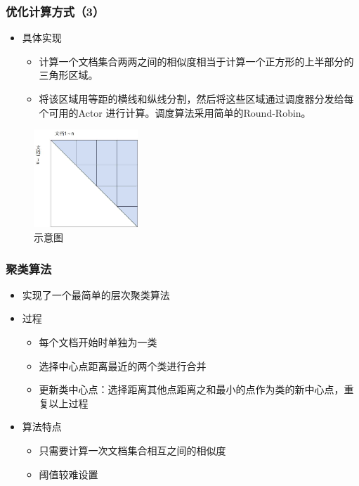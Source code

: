 \documentclass[11pt,presentation]{beamer}
\begin{document}
\begin{frame}
\frametitle{优化计算方式（3）}
\label{sec-2-12}
\begin{itemize}

\item 具体实现
\label{sec-2-12-1}%
\begin{itemize}
\item 计算一个文档集合两两之间的相似度相当于计算一个正方形的上半部分的三角形区域。
\item 将该区域用等距的横线和纵线分割，然后将这些区域通过调度器分发给每个可用的Actor
  进行计算。调度算法采用简单的Round-Robin。
\end{itemize}

\end{itemize} %
\label{sec-2-12-2}

\begin{figure}[htb]
\centering
\includegraphics[width=0.35\textwidth,angle=0]{./图片1.jpg}
\caption{\label{fig:1}示意图}
\end{figure}
\end{frame}
\begin{frame}
\frametitle{聚类算法}
\label{sec-2-13}
\begin{itemize}

\item 实现了一个最简单的层次聚类算法
\label{sec-2-13-1}%

\item 过程
\label{sec-2-13-2}%
\begin{itemize}
\item 每个文档开始时单独为一类
\item 选择中心点距离最近的两个类进行合并
\item 更新类中心点：选择距离其他点距离之和最小的点作为类的新中心点，重复以上过程
\end{itemize}

\item 算法特点
\label{sec-2-13-3}%
\begin{itemize}
\item 只需要计算一次文档集合相互之间的相似度
\item 阈值较难设置
\end{itemize}

\end{itemize} %
\end{frame}
\end{document}
